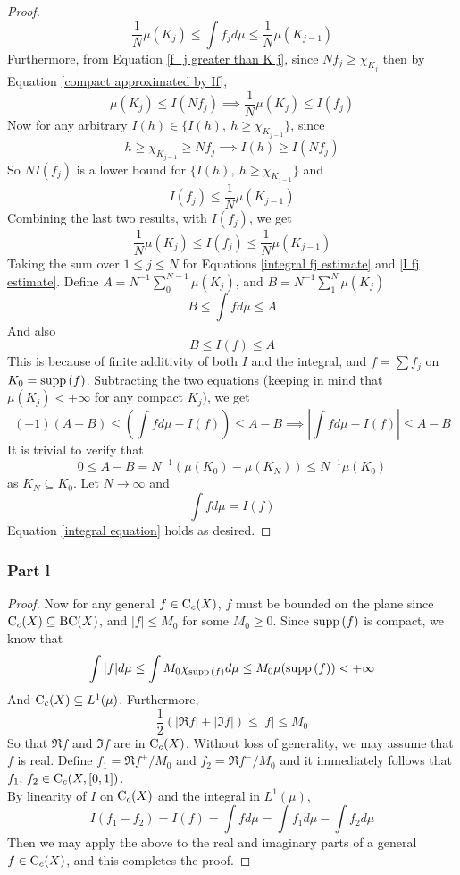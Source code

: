 \documentclass[../../main.tex]{subfiles}
\begin{document}
\begin{proof}
\begin{equation}
   \frac{1}{N}\mu(K_j)\leq \int f_jd\mu\leq \frac{1}{N}\mu(K_{j-1})
   \end{equation}
   Furthermore, from Equation \eqref{f_j greater than K j}, since $Nf_j\geq \chi_{K_j}$ then by Equation \eqref{compact approximated by If},
    \[
    \mu(K_j)\leq I(N f_j)\implies\dfrac{1}{N}\mu(K_j)\leq I(f_j)
    \]
    Now for any arbitrary $I(h)\in\{I(h),\: h\geq \chi_{K_{j-1}}\}$, since
    \[
    h\geq\chi_{K_{j-1}}\geq N f_j\implies I(h)\geq I(N f_j)
    \]
    So $NI(f_j)$ is a lower bound for $\{I(h),\: h\geq \chi_{K_{j-1}}\}$ and 
    \[
    I(f_j)\leq\dfrac{1}{N}\mu(K_{j-1})
    \]
    Combining the last two results, with $I(f_j)$, we get
    \begin{equation}\label{I fj estimate}
    \dfrac{1}{N}\mu(K_j)\leq I(f_j)\leq\dfrac{1}{N}\mu(K_{j-1})    
    \end{equation}
    Taking the sum over $1\leq j\leq N$ for Equations \eqref{integral fj estimate} and \eqref{I fj estimate}. Define $A = N^{-1}\sum_0^{N-1}\mu(K_j)$, and $B=N^{-1}\sum_1^{N}\mu(K_j)$
    \[
        B\leq \int fd\mu \leq A
    \]
    And also
    \[
        B\leq I(f)\leq A
    \]
    This is because of finite additivity of both $I$ and the integral, and $f = \sum f_j$ on $K_0=\operatorname{supp}{(f)}$. Subtracting the two equations (keeping in mind that $\mu(K_j)<+\infty$ for any compact $K_j$), we get
    \[
        (-1)(A-B)\leq \left(\int fd\mu - I(f)\right)\leq A-B\implies \left|\int fd\mu - I(f)\right|\leq A-B
    \]
    It is trivial to verify that 
    \[
    0\leq A-B = N^{-1}(\mu(K_0)-\mu(K_N))\leq N^{-1}\mu(K_0)
    \]
    as $K_N\subseteq K_0$. Let $N\to\infty$ and
    \[
    \int fd\mu = I(f)
    \]
    Equation \eqref{integral equation} holds as desired.
\end{proof}

\subsubsection{Part l}
\begin{proof}
Now for any general $f\in\operatorname{C}_c({X})$, $f$ must be bounded on the plane since $\operatorname{C}_c({X})\subseteq \operatorname{BC}({X})$, and $|f|\leq M_0$ for some $M_0\geq 0$. Since $\operatorname{supp}{(f)}$ is compact, we know that 
\[
\int |f|d\mu\leq \int M_0\chi_{\operatorname{supp}{(f)}}d\mu\leq M_0\mu(\operatorname{supp}{(f)})<+\infty
\]
And $\operatorname{C}_c({X})\subseteq L^1(\mu)$. Furthermore,
\[
\frac{1}{2}( |\Re{f}| + |\Im{f}| ) \leq |f|\leq M_0
\]
So that $\Re{f}$ and $\Im{f}$ are in $\operatorname{C}_c({X})$. Without loss of generality, we may assume that $f$ is real. Define $f_1 = \Re{f}^+/M_0$ and $f_2 = \Re{f}^-/M_0$ and it immediately follows that $f_1,\,f_2\in\operatorname{C}_c({X,[0,1]})$.\\

By linearity of $I$ on $\operatorname{C}_c({X})$ and the integral in $L^1(\mu)$, 
\[
I(f_1-f_2) = I(f) = \int fd\mu = \int f_1d\mu - \int f_2d\mu
\]
Then we may apply the above to the real and imaginary parts of a general $f\in\operatorname{C}_c({X})$, and this completes the proof.
\end{proof}
\end{document}
